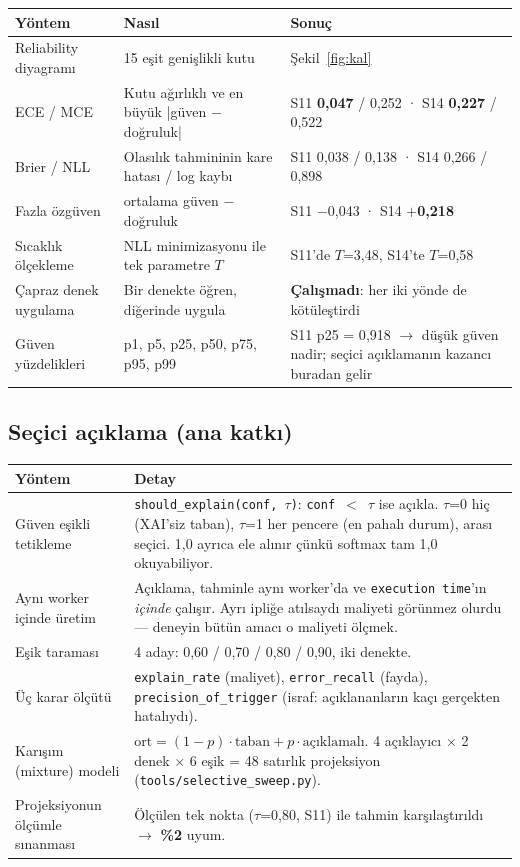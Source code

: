 \documentclass[11pt,a4paper]{article}
\newcommand{\kod}[1]{\texttt{\small #1}}
\newcommand{\dosya}[1]{\texttt{\footnotesize #1}}
\begin{document}
\begin{longtable}{@{}p{4.0cm}p{4.0cm}p{7.5cm}@{}}
\toprule
\textbf{Yöntem} & \textbf{Nasıl} & \textbf{Sonuç} \\
\midrule
\endhead
Reliability diyagramı & 15 eşit genişlikli kutu & Şekil~\ref{fig:kal} \\
\addlinespace
ECE / MCE & Kutu ağırlıklı ve en büyük |güven $-$ doğruluk| &
S11 \textbf{0{,}047} / 0{,}252 · S14 \textbf{0{,}227} / 0{,}522 \\
\addlinespace
Brier / NLL & Olasılık tahmininin kare hatası / log kaybı &
S11 0{,}038 / 0{,}138 · S14 0{,}266 / 0{,}898 \\
\addlinespace
Fazla özgüven & ortalama güven $-$ doğruluk & S11 $-$0{,}043 · S14 \textbf{$+$0{,}218} \\
\addlinespace
Sıcaklık ölçekleme & NLL minimizasyonu ile tek parametre $T$ &
S11'de $T$=3{,}48, S14'te $T$=0{,}58 \\
\addlinespace
Çapraz denek uygulama & Bir denekte öğren, diğerinde uygula &
\textbf{Çalışmadı}: her iki yönde de kötüleştirdi \\
\addlinespace
Güven yüzdelikleri & p1, p5, p25, p50, p75, p95, p99 &
S11 p25 = 0{,}918 $\rightarrow$ düşük güven nadir; seçici açıklamanın kazancı
buradan gelir \\
\bottomrule
\end{longtable}

\subsection{Seçici açıklama (ana katkı)}

\begin{longtable}{@{}p{4.0cm}p{11.5cm}@{}}
\toprule
\textbf{Yöntem} & \textbf{Detay} \\
\midrule
\endhead
Güven eşikli tetikleme & \kod{should\_explain(conf, $\tau$)}: \kod{conf $<$ $\tau$}
ise açıkla. $\tau$=0 hiç (XAI'siz taban), $\tau$=1 her pencere (en pahalı durum),
arası seçici. 1{,}0 ayrıca ele alınır çünkü softmax tam 1{,}0 okuyabiliyor. \\
\addlinespace
Aynı worker içinde üretim & Açıklama, tahminle aynı worker'da ve
\kod{execution time}'ın \emph{içinde} çalışır. Ayrı ipliğe atılsaydı maliyeti
görünmez olurdu --- deneyin bütün amacı o maliyeti ölçmek. \\
\addlinespace
Eşik taraması & 4 aday: 0{,}60 / 0{,}70 / 0{,}80 / 0{,}90, iki denekte. \\
\addlinespace
Üç karar ölçütü & \kod{explain\_rate} (maliyet), \kod{error\_recall} (fayda),
\kod{precision\_of\_trigger} (israf: açıklananların kaçı gerçekten hatalıydı). \\
\addlinespace
Karışım (mixture) modeli & $\text{ort} = (1-p)\cdot\text{taban} +
p\cdot\text{açıklamalı}$. 4 açıklayıcı $\times$ 2 denek $\times$ 6 eşik = 48
satırlık projeksiyon (\dosya{tools/selective\_sweep.py}). \\
\addlinespace
Projeksiyonun ölçümle sınanması & Ölçülen tek nokta ($\tau$=0{,}80, S11) ile
tahmin karşılaştırıldı $\rightarrow$ \textbf{\%2} uyum. \\
\bottomrule
\end{longtable}
\end{document}
